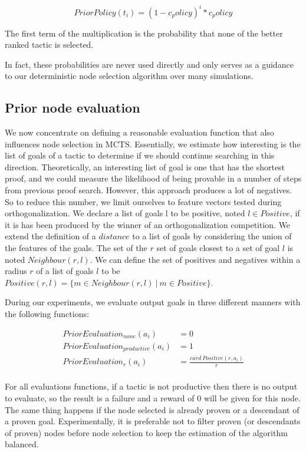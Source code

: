 \documentclass[runningheads,a4paper,draft]{svjour3}
\begin{document}
\[PriorPolicy(t_{i}) = (1 - c_policy)^{i} * c_policy\]

The first term of the multiplication is the probability that none of the better 
ranked tactic is selected. 

In fact, these probabilities are never used directly and only serves as a 
guidance to our deterministic node selection algorithm over many simulations.

\subsection{Prior node evaluation}

We now concentrate on defining a reasonable evaluation function that also 
influences node selection in MCTS. Essentially, we estimate how 
interesting is the list of goals of a tactic to determine if we should continue 
searching in this direction. Theoretically, an interesting list of goal is one 
that has the shortest proof, and we could measure the likelihood of being 
provable in a number of steps from previous proof search. However, this 
approach produces a lot of negatives. So to reduce this number, we limit 
ourselves to feature vectors tested during orthogonalization. We declare a list 
of goals l to be positive, noted $l \in Positive$, if it is has been 
produced by the winner of an orthogonalization competition. We extend the 
definition of a $distance$ to a list of goals by considering the union of the 
features of the goals. The set of the $r$ set of goals closest to a set of 
goal $l$ is noted $Neighbour(r,l)$. We can define the set of positives and 
negatives within a radius $r$ of a 
list of goals $l$ to be $Positive(r,l) = \lbrace m \in Neighbour(r,l)\ |\ m \in 
Positive \rbrace$.

During our experiments, we evaluate output goals in three different manners 
with the following functions:

\begin{align*}
PriorEvaluation_{none} (a_i) &= 0 \\
PriorEvaluation_{productive} (a_i) &= 1\\
PriorEvaluation_r (a_i) &= \frac{card\ Positive(r,a_i)}{r}\\
\end{align*}

For all evaluations functions, if a tactic is not productive then there is no 
output to evaluate, so the result is a failure and a reward of $0$ will be 
given for this node. The same thing happens if the node selected is already 
proven or a descendant of a proven goal. 
Experimentally, it is preferable not to 
filter proven (or descendants of proven) nodes before 
node selection to keep the estimation of the algorithm balanced.
\end{document}
